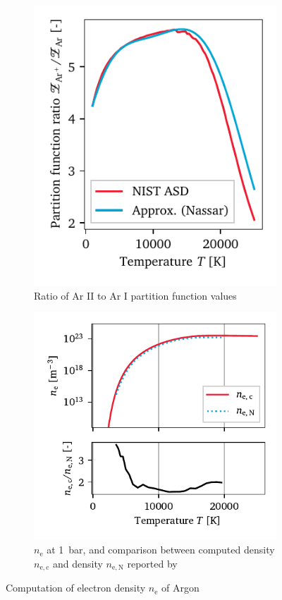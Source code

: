         \begin{figure}[h]
            \centering
            \begin{subfigure}[t]{2.6in}
                \centering
                \includegraphics[]{assets/4 models/partition}
                \caption{Ratio of Ar II to Ar I partition function values}
                \label{fig:e_density_partition}
            \end{subfigure}
            \hfill
            \begin{subfigure}[t]{3.2in}
                \centering
                \includegraphics[]{assets/4 models/n_e}
                \caption{$n_\mathrm{e}$ at \qty{1}{bar}, and comparison between computed density $n_\mathrm{e, c}$ and density $n_\mathrm{e, N}$ reported by \textcite{nassarInvestigationLasersustainedPlasma2012}}
                \label{fig:e_density_curves}
            \end{subfigure}
            \caption{Computation of electron density $n_\mathrm{e}$ of Argon}
            \label{fig:e_density}
        \end{figure}


